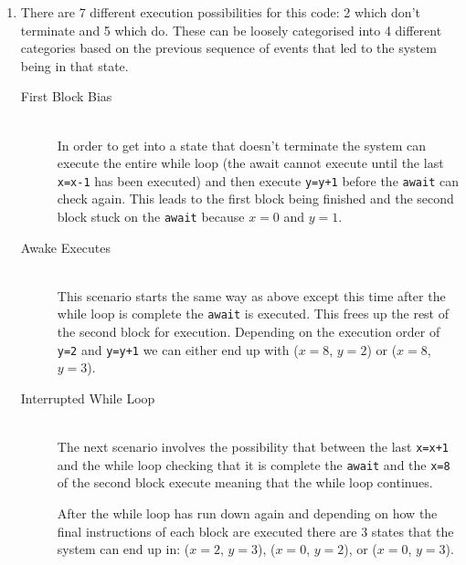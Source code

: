 \documentclass[12pt, a4paper]{article}
\begin{document}
\begin{enumerate}
\begin{enumerate}
        \end{enumerate}

    \item

        There are 7 different execution possibilities for this code:
        2 which don't terminate and 5 which do. These can be loosely
        categorised into 4 different categories based on the previous
        sequence of events that led to the system being in that
        state.

        \begin{description}

            \item[First Block Bias] \hfill \\
                In order to get into a state that doesn't terminate the
                system can execute the entire while loop (the await
                cannot execute until the last \texttt{x=x-1} has been
                executed) and then execute \texttt{y=y+1} before the
                \texttt{await} can check again. This leads to the first
                block being finished and the second block stuck on the
                \texttt{await} because $x=0$ and $y=1$.

            \vspace{0.2cm}
            \item[Awake Executes] \hfill \\
                This scenario starts the same way as above except this
                time after the while loop is complete the
                \texttt{await} is executed. This frees up the rest of
                the second block for execution. Depending on the
                execution order of \texttt{y=2} and \texttt{y=y+1} we
                can either end up with ($x=8$, $y=2$) or ($x=8$,
                $y=3$).

            \vspace{0.2cm}
            \item[Interrupted While Loop] \hfill \\
                The next scenario involves the possibility that between
                the last \texttt{x=x+1} and the while loop checking
                that it is complete the \texttt{await} and the
                \texttt{x=8} of the second block execute meaning that
                the while loop continues.

                After the while loop has run down again and depending
                on how the final instructions of each block are
                executed there are 3 states that the system can end up
                in: ($x=2$, $y=3$), ($x=0$, $y=2$), or ($x=0$, $y=3$).


\end{description}
\end{enumerate}
\end{document}
